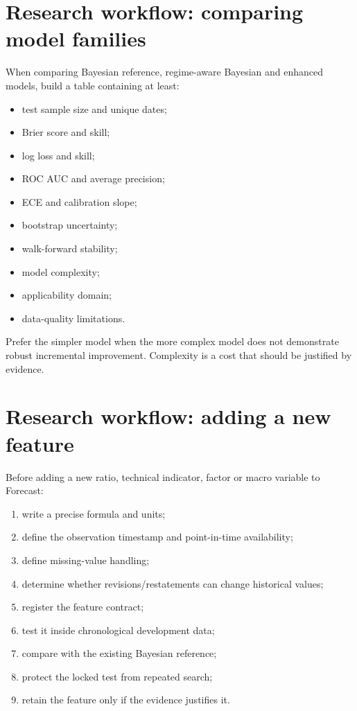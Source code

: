 \documentclass[11pt]{article}
\begin{document}
\section{Research workflow: comparing model families}
When comparing Bayesian reference, regime-aware Bayesian and enhanced models, build a table containing at least:
\begin{itemize}[itemsep=0.15em]
\item test sample size and unique dates;
\item Brier score and skill;
\item log loss and skill;
\item ROC AUC and average precision;
\item ECE and calibration slope;
\item bootstrap uncertainty;
\item walk-forward stability;
\item model complexity;
\item applicability domain;
\item data-quality limitations.
\end{itemize}

Prefer the simpler model when the more complex model does not demonstrate robust incremental improvement. Complexity is a cost that should be justified by evidence.

\section{Research workflow: adding a new feature}
Before adding a new ratio, technical indicator, factor or macro variable to Forecast:
\begin{enumerate}[itemsep=0.2em]
\item write a precise formula and units;
\item define the observation timestamp and point-in-time availability;
\item define missing-value handling;
\item determine whether revisions/restatements can change historical values;
\item register the feature contract;
\item test it inside chronological development data;
\item compare with the existing Bayesian reference;
\item protect the locked test from repeated search;
\item retain the feature only if the evidence justifies it.
\end{enumerate}
\end{document}
